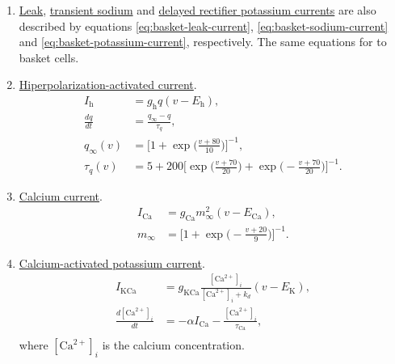 \documentclass[../main.tex]{subfiles}
\begin{document}
\begin{enumerate}
    \item \underline{Leak}, \underline{transient sodium} and \underline{delayed rectifier potassium currents} are also described by equations \eqref{eq:basket-leak-current}, \eqref{eq:basket-sodium-current} and \eqref{eq:basket-potassium-current}, respectively.
    The same equations for to basket cells.
    \item \underline{Hiperpolarization-activated current}.
        \begin{equation}
        \begin{aligned}
            I_{\text{h}} &= g_{\text{h}} q(v-E_{\text{h}}), \\
            \displaystyle\frac{dq}{dt} &= \displaystyle\frac{q_{\infty}-q}{\tau_q}, \\
            q_{\infty}(v) &= \Bigg[1+\exp{\bigg( \frac{v+80}{10}
            \bigg)}\Bigg]^{-1}, \\
            \tau_q(v) &= 5+200\Bigg[ \exp{\bigg( \displaystyle\frac{v+70}{20}\bigg)}+\exp{\bigg(-\displaystyle\frac{v+70}{20}\bigg)}\Bigg]^{-1}.
            \label{eq:olm-hiperpolarization-current}
        \end{aligned}
        \end{equation}
    \item \underline{Calcium current}. 
        \begin{equation}
        \begin{aligned}
        I_{\text{Ca}} &= g_{\text{Ca}}m_\infty^2(v-E_{\text{Ca}}), \\
        m_\infty &= \Bigg[ 1+\exp{ \bigg( -\displaystyle\frac{v+20}{9} \bigg)} \Bigg]^{-1}.
        \label{eq:olm-calcium-current-2}
        \end{aligned}
        \end{equation}
    \clearpage
     \item \underline{Calcium-activated potassium current}.
        \begin{equation}
        \begin{aligned}
            I_{\text{KCa}} &= g_{\text{KCa}}\displaystyle\frac{[\text{Ca}^{2+}]_{i}}{[\text{Ca}^{2+}]_{i}+k_d}(v-E_{\text{K}}),\\
            \displaystyle\frac{d[\text{Ca}^{2+}]_{i}}{dt} &= -\alpha I_{\text{Ca}}-\displaystyle\frac{[\text{Ca}^{2+}]_{i}}{\tau_{\text{Ca}}}, \\
        \end{aligned}
        \label{eq:olm-potassium-current}
        \end{equation}
        where $[\text{Ca}^{2+}]_{i}$ is the calcium concentration.
\end{enumerate}
\end{document}
